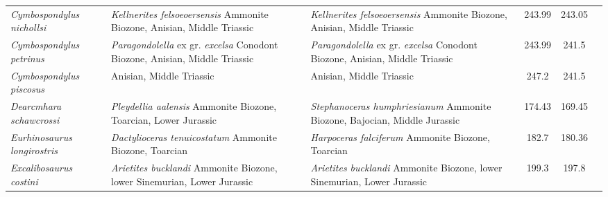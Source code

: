 \begin{longtabu}{>{\itshape}lXXSSl}
	Cymbospondylus nichollsi                             & \emph{Kellnerites felsoeoersensis} Ammonite Biozone, Anisian, Middle Triassic                                                      & \emph{Kellnerites felsoeoersensis} Ammonite Biozone, Anisian, Middle Triassic                                                      & 243.99                   & 243.05                   & \cite{Frobisch2006} \\                   
	Cymbospondylus petrinus                              & \emph{Paragondolella} ex gr. \emph{excelsa} Conodont Biozone, Anisian, Middle Triassic                                             & \emph{Paragondolella} ex gr. \emph{excelsa} Conodont Biozone, Anisian, Middle Triassic                                             & 243.99                   & 241.5                    & \cite{Merriam1908} \\                    
	Cymbospondylus piscosus                              & Anisian, Middle Triassic                                                                                                           & Anisian, Middle Triassic                                                                                                           & 247.2                    & 241.5                    & \cite{Merriam1908} \\                    
	Dearcmhara schawcrossi                               & \emph{Pleydellia aalensis} Ammonite Biozone, Toarcian, Lower Jurassic                                                              & \emph{Stephanoceras humphriesianum} Ammonite Biozone, Bajocian, Middle Jurassic                                                    & 174.43                   & 169.45                   & \cite{Brusatte2015} \\                   
	Eurhinosaurus longirostris                           & \emph{Dactylioceras tenuicostatum} Ammonite Biozone, Toarcian                                                                      & \emph{Harpoceras falciferum} Ammonite Biozone, Toarcian                                                                            & 182.7                    & 180.36                   & \cite{Huene1951,McGowan1986} \\          
	Excalibosaurus costini                               & \emph{Arietites bucklandi} Ammonite Biozone, lower Sinemurian, Lower Jurassic                                                      & \emph{Arietites bucklandi} Ammonite Biozone, lower Sinemurian, Lower Jurassic                                                      & 199.3                    & 197.8                    & \cite{McGowan2003,McGowan1986} \\        

\end{longtabu}
